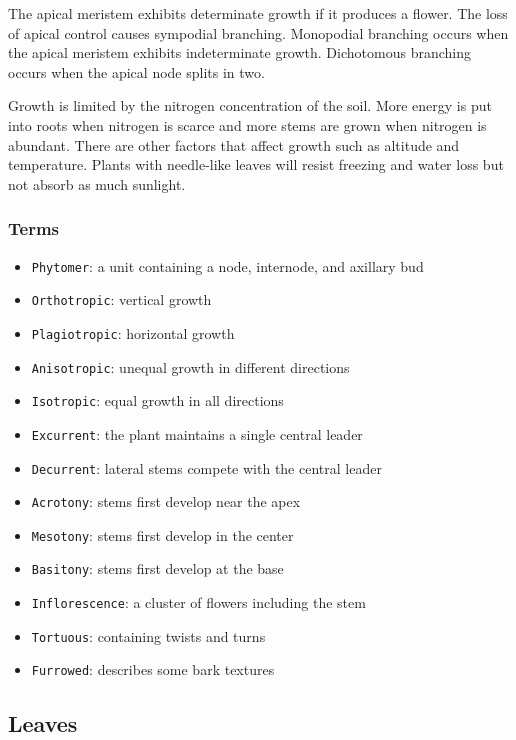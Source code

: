 \documentclass[10pt]{article}
\begin{document}
The apical meristem exhibits determinate growth if it produces a flower. The loss of apical control causes sympodial branching. Monopodial branching occurs when the apical meristem exhibits indeterminate growth. Dichotomous branching occurs when the apical node splits in two.

Growth is limited by the nitrogen concentration of the soil. More energy is put into roots when nitrogen is scarce and more stems are grown when nitrogen is abundant. There are other factors that affect growth such as altitude and temperature. Plants with needle-like leaves will resist freezing and water loss but not absorb as much sunlight.

\subsubsection{Terms}

\begin{itemize}
\item \texttt{Phytomer}: a unit containing a node, internode, and axillary bud
\item \texttt{Orthotropic}: vertical growth
\item \texttt{Plagiotropic}: horizontal growth
\item \texttt{Anisotropic}: unequal growth in different directions
\item \texttt{Isotropic}: equal growth in all directions
\item \texttt{Excurrent}: the plant maintains a single central leader
\item \texttt{Decurrent}: lateral stems compete with the central leader
\item \texttt{Acrotony}: stems first develop near the apex
\item \texttt{Mesotony}: stems first develop in the center
\item \texttt{Basitony}: stems first develop at the base
\item \texttt{Inflorescence}: a cluster of flowers including the stem
\item \texttt{Tortuous}: containing twists and turns
\item \texttt{Furrowed}: describes some bark textures
\end{itemize}

\subsection{Leaves}
\end{document}
